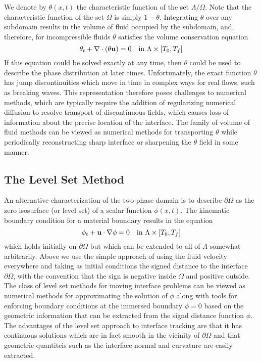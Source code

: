 \documentclass[letterpaper]{erdc}
\begin{document}
We denote by $\theta(x,t)$ the characteristic function of the set
$\Lambda/\Omega$. Note that the characteristic function of the set
$\Omega$ is simply $1-\theta$. Integrating $\theta$ over any subdomain results
in the volume of fluid occupied by the subdomain, and, therefore, for
incompressible fluids $\theta$ satisfies the volume conservation equation
\begin{equation}
    \theta_t + \nabla\cdot\left( \theta \textbf{u}\right) = 0 \quad \mbox{in }\Lambda\times[T_0,T_f]
\end{equation}
If this equation could be solved exactly at any time, then $\theta$
could be used to describe the phase distribution at later
times. Unfortunately, the exact function $\theta$ has jump
discontinuities which move in time in complex ways for real flows,
such as breaking waves. This representation therefore poses challenges
to numerical methods, which are typically require the addition of
regularizing numerical diffusion to resolve transport of discontinuous
fields, which causes loss of information about the precise location of
the interface.  The family of volume of fluid methods can be viewed as
numerical methods for transporting $\theta$ while periodically reconstructing sharp interface or sharpening the $\theta$ field in some manner.

\subsection{The Level Set Method}\label{sec:LevelSetMethod}

An alternative characterization of the two-phase domain is to describe
$\partial \Omega$ as the zero isosurface (or level set) of a scalar
function $\phi(x,t)$. The kinematic boundary condition for a material
boundary results in the equation
\begin{equation}\label{eqn:variabledensityequation}
    \phi_t + \textbf{u} \cdot \nabla \phi = 0 \quad  \mbox{in }\Lambda\times[T_0,T_f]
\end{equation}
which holds initially on $\partial \Omega$ but which can be extended
to all of $\Lambda$ somewhat arbitrarily. Above we use the simple
approach of using the fluid velocity everywhere and taking as initial
conditions the signed distance to the interface $\partial \Omega$,
with the convention that the sign is negative inside $\Omega$ and
positive outside. The class of level set methods for moving interface
problems can be viewed as numerical methods for approximating the
solution of $\phi$ along with tools for enforcing boundary conditions
at the immersed boundary $\phi=0$ based on the geometric information
that can be extracted from the signd distance function $\phi$.  The
advantages of the level set approach to interface tracking are that it
has continuous solutions which are in fact smooth in the vicinity of
$\partial \Omega$ and that geometric quantiteis such as the interface
normal and curvature are easily extracted.
\end{document}
